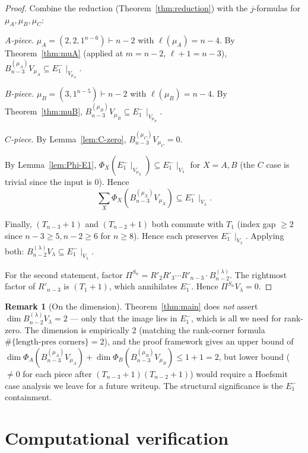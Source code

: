 \documentclass[11pt]{article}
\theoremstyle{definition}
\newtheorem{remark}[theorem]{Remark}
\begin{document}
\begin{proof}
Combine the reduction (Theorem~\ref{thm:reduction}) with the
$j$-formulas for $\mu_A,\mu_B,\mu_C$:

\emph{$A$-piece.}  $\mu_A=(2,2,1^{n-6})\vdash n-2$ with
$\ell(\mu_A)=n-4$.  By Theorem~\ref{thm:muA} (applied at $m=n-2$,
$\ell+1=n-3$), $B_{n-3}^{(\mu_A)} V_{\mu_A}\subseteq
E_1^-\!\mid_{V_{\mu_A}}$.

\emph{$B$-piece.}  $\mu_B=(3,1^{n-5})\vdash n-2$ with
$\ell(\mu_B)=n-4$.  By Theorem~\ref{thm:muB},
$B_{n-3}^{(\mu_B)} V_{\mu_B}\subseteq E_1^-\!\mid_{V_{\mu_B}}$.

\emph{$C$-piece.}  By Lemma~\ref{lem:C-zero},
$B_{n-3}^{(\mu_C)} V_{\mu_C}=0$.

By Lemma~\ref{lem:Phi-E1}, $\Phi_X(E_1^-\!\mid_{V_{\mu_X}})\subseteq
E_1^-\!\mid_{V_\lambda}$ for $X=A,B$ (the $C$ case is trivial since
the input is $0$).  Hence
\[
   \sum_X\Phi_X(B_{n-3}^{(\mu_X)} V_{\mu_X})\subseteq
   E_1^-\!\mid_{V_\lambda}.
\]

Finally, $(T_{n-3}{+}1)$ and $(T_{n-2}{+}1)$ both commute with $T_1$
(index gap $\ge 2$ since $n-3\ge 5,n-2\ge 6$ for $n\ge 8$).  Hence
each preserves $E_1^-\!\mid_{V_\lambda}$.  Applying both:
$B_{n-2}^{(\lambda)} V_\lambda\subseteq E_1^-\!\mid_{V_\lambda}$.

For the second statement, factor
$\Pi^{S_n}=R'_2 R'_3\cdots R'_{n-3}\cdot B_{n-2}^{(\lambda)}$.
The rightmost factor of $R'_{n-3}$ is $(T_1{+}1)$, which
annihilates $E_1^-$.  Hence $\Pi^{S_n}V_\lambda=0$.
\end{proof}

\begin{remark}[On the dimension]
Theorem~\ref{thm:main} does \emph{not} assert
$\dim B_{n-2}^{(\lambda)} V_\lambda=2$ --- only that the image lies
in $E_1^-$, which is all we need for rank-zero.  The dimension is
empirically $2$ (matching the rank-corner formula
$\#\{\text{length-pres corners}\}=2$), and the proof framework
gives an upper bound of $\dim\Phi_A(B_{n-3}^{(\mu_A)} V_{\mu_A})+
\dim\Phi_B(B_{n-3}^{(\mu_B)} V_{\mu_B})\le 1+1=2$, but lower bound
($\ne 0$ for each piece after $(T_{n-3}{+}1)(T_{n-2}{+}1)$) would
require a Hoefsmit case analysis we leave for a future writeup.
The structural significance is the $E_1^-$ containment.
\end{remark}

\section{Computational verification}\label{sec:verify}
\end{document}
